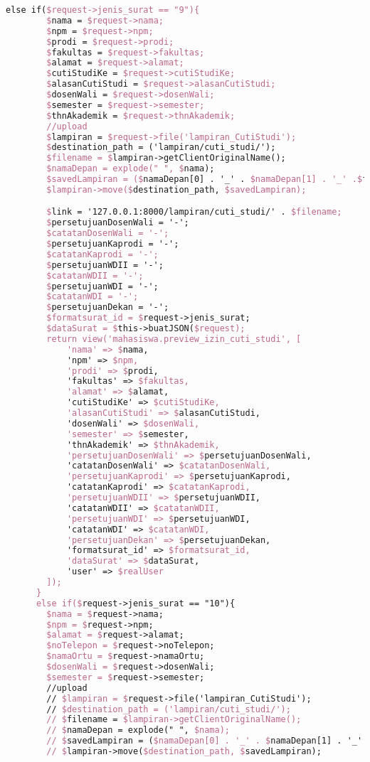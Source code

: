 \begin{lstlisting}[language=tex,basicstyle=\tiny,caption=PesanansuratController.php]
      else if($request->jenis_surat == "9"){
        $nama = $request->nama;
        $npm = $request->npm;
        $prodi = $request->prodi;
        $fakultas = $request->fakultas;
        $alamat = $request->alamat;
        $cutiStudiKe = $request->cutiStudiKe;
        $alasanCutiStudi = $request->alasanCutiStudi;
        $dosenWali = $request->dosenWali;
        $semester = $request->semester;
        $thnAkademik = $request->thnAkademik;
        //upload
        $lampiran = $request->file('lampiran_CutiStudi');
        $destination_path = ('lampiran/cuti_studi/');
        $filename = $lampiran->getClientOriginalName();
        $namaDepan = explode(" ", $nama);
        $savedLampiran = ($namaDepan[0] . '_' . $namaDepan[1] . '_' .$filename);
        $lampiran->move($destination_path, $savedLampiran);

        $link = '127.0.0.1:8000/lampiran/cuti_studi/' . $filename;
        $persetujuanDosenWali = '-';
        $catatanDosenWali = '-';
        $persetujuanKaprodi = '-';
        $catatanKaprodi = '-';
        $persetujuanWDII = '-';
        $catatanWDII = '-';
        $persetujuanWDI = '-';
        $catatanWDI = '-';
        $persetujuanDekan = '-';
        $formatsurat_id = $request->jenis_surat;
        $dataSurat = $this->buatJSON($request);
        return view('mahasiswa.preview_izin_cuti_studi', [
            'nama' => $nama,
            'npm' => $npm,
            'prodi' => $prodi,
            'fakultas' => $fakultas,
            'alamat' => $alamat,
            'cutiStudiKe' => $cutiStudiKe,
            'alasanCutiStudi' => $alasanCutiStudi,
            'dosenWali' => $dosenWali,
            'semester' => $semester,
            'thnAkademik' => $thnAkademik,
            'persetujuanDosenWali' => $persetujuanDosenWali,
            'catatanDosenWali' => $catatanDosenWali,
            'persetujuanKaprodi' => $persetujuanKaprodi,
            'catatanKaprodi' => $catatanKaprodi,
            'persetujuanWDII' => $persetujuanWDII,
            'catatanWDII' => $catatanWDII,
            'persetujuanWDI' => $persetujuanWDI,
            'catatanWDI' => $catatanWDI,
            'persetujuanDekan' => $persetujuanDekan,
            'formatsurat_id' => $formatsurat_id,
            'dataSurat' => $dataSurat,
            'user' => $realUser
        ]);
      }
      else if($request->jenis_surat == "10"){
        $nama = $request->nama;
        $npm = $request->npm;
        $alamat = $request->alamat;
        $noTelepon = $request->noTelepon;
        $namaOrtu = $request->namaOrtu;
        $dosenWali = $request->dosenWali;
        $semester = $request->semester;
        //upload
        // $lampiran = $request->file('lampiran_CutiStudi');
        // $destination_path = ('lampiran/cuti_studi/');
        // $filename = $lampiran->getClientOriginalName();
        // $namaDepan = explode(" ", $nama);
        // $savedLampiran = ($namaDepan[0] . '_' . $namaDepan[1] . '_' .$filename);
        // $lampiran->move($destination_path, $savedLampiran);


\end{lstlisting}
